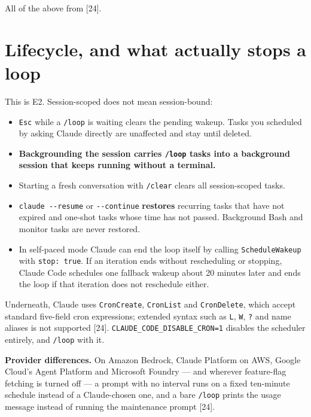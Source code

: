 \documentclass[11pt,a4paper,twoside,openany]{book}
\begin{document}
All of the above from [24].


\FloatBarrier
\setcounter{section}{2}
\section{Lifecycle, and what actually stops a loop}

This is E2. Session-scoped does not mean session-bound:


\begin{itemize}
\item \texttt{Esc} while a \texttt{/\allowbreak{}loop} is waiting clears the pending wakeup. Tasks you scheduled by asking Claude directly are unaffected and stay until deleted.
\item \textbf{Backgrounding the session carries \texttt{/\allowbreak{}loop} tasks into a background session that keeps running without a terminal.}
\item Starting a fresh conversation with \texttt{/\allowbreak{}clear} clears all session-scoped tasks.
\item \texttt{claude -\allowbreak{}-\allowbreak{}resume} or \texttt{-\allowbreak{}-\allowbreak{}continue} \textbf{restores} recurring tasks that have not expired and one-shot tasks whose time has not passed. Background Bash and monitor tasks are never restored.
\item In self-paced mode Claude can end the loop itself by calling \texttt{Schedule\allowbreak{}Wakeup} with \texttt{stop:\allowbreak{} true}. If an iteration ends without rescheduling or stopping, Claude Code schedules one fallback wakeup about 20 minutes later and ends the loop if that iteration does not reschedule either.
\end{itemize}

Underneath, Claude uses \texttt{Cron\allowbreak{}Create}, \texttt{Cron\allowbreak{}List} and \texttt{Cron\allowbreak{}Delete}, which accept standard five-field cron expressions; extended syntax such as \texttt{L}, \texttt{W}, \texttt{?} and name aliases is not supported [24]. \texttt{CLAUDE\_\allowbreak{}CODE\_\allowbreak{}DISABLE\_\allowbreak{}CRON=\allowbreak{}1} disables the scheduler entirely, and \texttt{/\allowbreak{}loop} with it.


\textbf{Provider differences.} On Amazon Bedrock, Claude Platform on AWS, Google Cloud's Agent Platform and Microsoft Foundry — and wherever feature-flag fetching is turned off — a prompt with no interval runs on a fixed ten-minute schedule instead of a Claude-chosen one, and a bare \texttt{/\allowbreak{}loop} prints the usage message instead of running the maintenance prompt [24].
\end{document}
